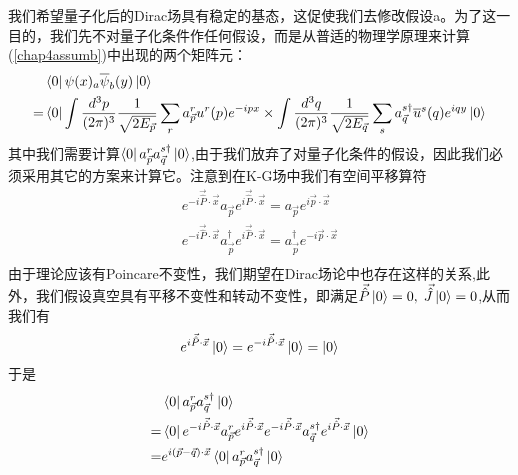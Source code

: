 我们希望量子化后的Dirac场具有稳定的基态，这促使我们去修改假设a。为了这一目的，我们先不对量子化条件作任何假设，而是从普适的物理学原理来计算(\ref{chap4assumb})中出现的两个矩阵元：
\begin{equation}
\label{chap4_1359}
    \begin{aligned}
       &\bra{0}\psi(x)_{a}\overline{\psi}_{b}(y)\ket{0}\\
       =&\bra{0}\int \frac{d^{3}p}{(2\pi)^{3}}\frac{1}{\sqrt{2E_{\vec{p}}}}\sum\limits_{r}a^{r}_{\vec{p}}u^{r}(p)e^{-ipx}\times \int \frac{d^{3}q}{(2\pi)^{3}}\frac{1}{\sqrt{2E_{\vec{q}}}}\sum\limits_{s}a^{s\dagger}_{\vec{q}}\overline{u}^{s}(q)e^{iqy} \ket{0}\\
    \end{aligned}
\end{equation}
其中我们需要计算$\bra{0}a^{r}_{\vec{p}}a^{s\dagger}_{\vec{q}}\ket{0}$,由于我们放弃了对量子化条件的假设，因此我们必须采用其它的方案来计算它。注意到在K-G场中我们有空间平移算符
\begin{equation}
    \begin{aligned}
    e^{-i\vec{\hat{P}}\cdot\vec{x}}a_{\vec{p}} e^{i\vec{\hat{P}}\cdot\vec{x}}=a_{\vec{p}}e^{i\vec{p}\cdot\vec{x}}\\
    e^{-i\vec{\hat{P}}\cdot\vec{x}}a_{\vec{p}}^{\dagger} e^{i\vec{\hat{P}}\cdot\vec{x}}=a_{\vec{p}}^{\dagger}e^{-i\vec{p}\cdot\vec{x}}\\
    \end{aligned}
\end{equation}
由于理论应该有Poincare不变性，我们期望在Dirac场论中也存在这样的关系,此外，我们假设真空具有平移不变性和转动不变性，即满足$\vec{\hat{P}}\ket{0}=0,\;\vec{\hat{J}}\ket{0}=0$,从而我们有
\begin{equation}
    e^{i\vec{\hat{P}}\cdot\vec{x}}\ket{0}= e^{-i\vec{\hat{P}}\cdot\vec{x}}\ket{0}=\ket{0}
\end{equation}
于是
\begin{equation}
    \begin{aligned}
    &\bra{0}a^{r}_{\vec{p}}a^{s\dagger}_{\vec{q}}\ket{0}\\
    =&\bra{0}e^{-i\vec{\hat{P}}\cdot\vec{x}}a^{r}_{\vec{p}}e^{i\vec{\hat{P}}\cdot\vec{x}}e^{-i\vec{\hat{P}}\cdot\vec{x}}a^{s\dagger}_{\vec{q}}e^{i\vec{\hat{P}}\cdot\vec{x}}\ket{0}\\
    =&e^{i(\vec{p}-\vec{q})\cdot \vec{x}}\bra{0}a^{r}_{\vec{p}}a^{s\dagger}_{\vec{q}}\ket{0}\\
    \end{aligned}
\end{equation}
